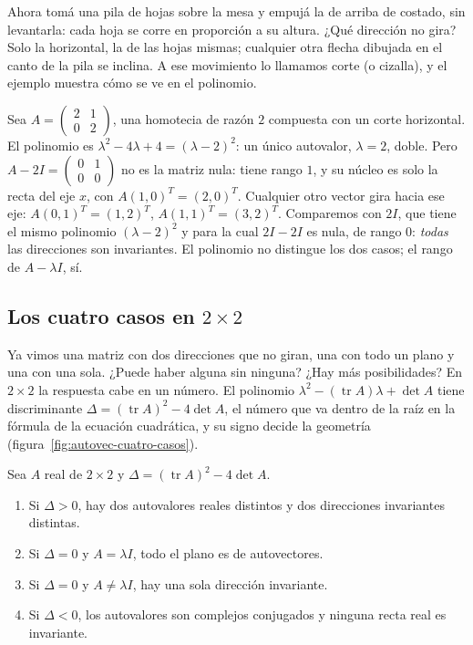 Ahora tomá una pila de hojas sobre la mesa y empujá la de arriba de costado, sin levantarla:
cada hoja se corre en proporción a su altura. ¿Qué dirección no gira? Solo la horizontal, la de
las hojas mismas; cualquier otra flecha dibujada en el canto de la pila se inclina. A ese
movimiento lo llamamos corte (o cizalla), y el ejemplo muestra cómo se ve en el polinomio.

\begin{ejemplo}\label{ej:autovec-cizalla}
Sea \(A=\begin{pmatrix}2&1\\0&2\end{pmatrix}\), una homotecia de razón \(2\) compuesta con un
corte horizontal. El polinomio es \(\lambda^2-4\lambda+4=(\lambda-2)^2\): un único
autovalor, \(\lambda=2\), doble. Pero
\(A-2I=\left(\begin{smallmatrix}0&1\\0&0\end{smallmatrix}\right)\) no es la matriz nula:
tiene rango \(1\), y su núcleo es solo la recta del eje \(x\), con \(A(1,0)^T=(2,0)^T\).
Cualquier otro vector gira hacia ese eje: \(A(0,1)^T=(1,2)^T\), \(A(1,1)^T=(3,2)^T\).
Comparemos con \(2I\), que tiene el mismo polinomio
\((\lambda-2)^2\) y para la cual \(2I-2I\) es nula, de rango \(0\): \emph{todas} las
direcciones son invariantes. El polinomio no distingue los dos casos; el rango de
\(A-\lambda I\), sí.
\end{ejemplo}

\subsection{Los cuatro casos en \texorpdfstring{$2\times2$}{2x2}}\label{sec:cuatro-casos}

Ya vimos una matriz con dos direcciones que no giran, una con todo un plano y una con una
sola. ¿Puede haber alguna sin ninguna? ¿Hay más posibilidades? En \(2\times2\) la respuesta
cabe en un número. El polinomio \(\lambda^2-(\operatorname{tr}A)\lambda+\det A\) tiene
discriminante \(\Delta=(\operatorname{tr}A)^2-4\det A\), el número que va dentro de la raíz en
la fórmula de la ecuación cuadrática, y su signo decide la geometría
(figura~\ref{fig:autovec-cuatro-casos}).

\begin{proposicion}\label{prop:cuatro-casos}
Sea \(A\) real de \(2\times2\) y \(\Delta=(\operatorname{tr}A)^2-4\det A\).
\begin{enumerate}
  \item Si \(\Delta>0\), hay dos autovalores reales distintos y dos direcciones invariantes
  distintas.
  \item Si \(\Delta=0\) y \(A=\lambda I\), todo el plano es de autovectores.
  \item Si \(\Delta=0\) y \(A\neq\lambda I\), hay una sola dirección invariante.
  \item Si \(\Delta<0\), los autovalores son complejos conjugados y ninguna recta real es
  invariante.
\end{enumerate}
\end{proposicion}

